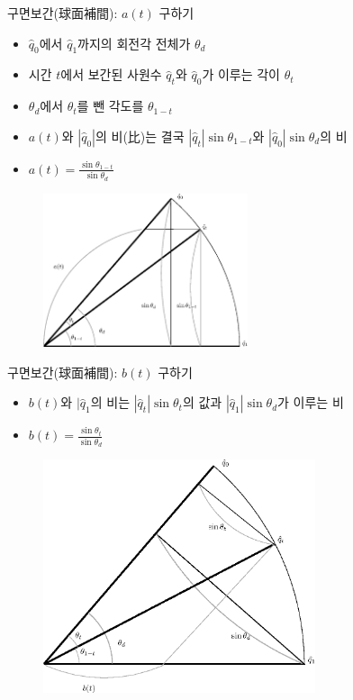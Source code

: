 \begin{frame}[fragile]{구면보간(球面補間): $a(t)$ 구하기}

\begin{itemize}
\item $\hat q_0$에서 $\hat q_1$까지의 회전각 전체가 $\theta_d$
\item 시간 $t$에서 보간된 사원수 $\hat q_t$와 $\hat q_0$가 이루는 각이 $\theta_t$
\item $\theta_d$에서 $\theta_t$를 뺀 각도를 $\theta_{1-t}$
\item $a(t)$와 $|\hat q_0 |$의 비(比)는 결국 $|\hat q_t| \sin \theta_{1-t}$와 $|\hat q_0| \sin \theta_d$의 비
\item $a(t) = \frac{\sin \theta_{1-t}}{\sin \theta_d} $
\end{itemize}

\begin{figure}
	\includegraphics[width=6cm]{Math_quaternion/quaternionSlerpA.eps}
\end{figure}

\end{frame}

\begin{frame}[fragile]{구면보간(球面補間): $b(t)$ 구하기}

\begin{itemize}
\item $b(t)$와 $|\hat q_1$의 비는 $|\hat q_t | \sin \theta_t$의 값과 $|\hat q_1 | \sin \theta_d$가 이루는 비
\item $b(t) = \frac{\sin \theta_{t}}{\sin \theta_d} $
\end{itemize}

\begin{figure}
	\includegraphics[width=8cm]{Math_quaternion/quaternionSlerpB.eps}
\end{figure}


\end{frame}

